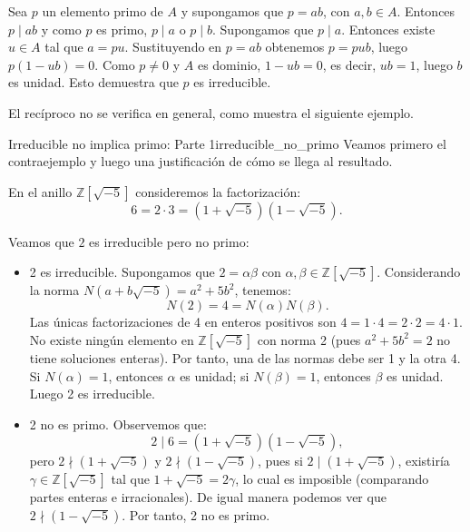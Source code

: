 \begin{proofbox}
Sea \(p\) un elemento primo de \(A\) y supongamos que \(p = ab\), con \(a, b \in A\). Entonces \(p \mid ab\) y como \(p\) es primo, \(p \mid a\) o \(p \mid b\). Supongamos que \(p \mid a\). Entonces existe \(u \in A\) tal que \(a = pu\). Sustituyendo en \(p = ab\) obtenemos \(p = pub\), luego \(p(1 - ub) = 0\). Como \(p \neq 0\) y \(A\) es dominio, \(1 - ub = 0\), es decir, \(ub = 1\), luego \(b\) es unidad. Esto demuestra que \(p\) es irreducible.
\end{proofbox}

El recíproco no se verifica en general, como muestra el siguiente ejemplo.

\begin{example}{Irreducible no implica primo: Parte 1}{irreducible_no_primo}
Veamos primero el contraejemplo y luego una justificación de cómo se llega al resultado.

En el anillo \(\mathbb{Z}[\sqrt{-5}]\) consideremos la factorización:
\[
6 = 2 \cdot 3 = (1 + \sqrt{-5})(1 - \sqrt{-5}).
\]

Veamos que \(2\) es irreducible pero no primo:
\begin{itemize}
\item 2 es irreducible. Supongamos que \(2 = \alpha\beta\) con \(\alpha, \beta \in \mathbb{Z}[\sqrt{-5}]\). Considerando la norma \(N(a + b\sqrt{-5}) = a^2 + 5b^2\), tenemos:
\[
N(2) = 4 = N(\alpha)N(\beta).
\]
Las únicas factorizaciones de 4 en enteros positivos son \(4 = 1 \cdot 4 = 2 \cdot 2 = 4 \cdot 1\). No existe ningún elemento en \(\mathbb{Z}[\sqrt{-5}]\) con norma 2 (pues \(a^2 + 5b^2 = 2\) no tiene soluciones enteras). Por tanto, una de las normas debe ser 1 y la otra 4. Si \(N(\alpha) = 1\), entonces \(\alpha\) es unidad; si \(N(\beta) = 1\), entonces \(\beta\) es unidad. Luego 2 es irreducible.

\item 2 no es primo. Observemos que:
\[
2 \mid 6 = (1 + \sqrt{-5})(1 - \sqrt{-5}),
\]
pero \(2 \nmid (1 + \sqrt{-5})\) y \(2 \nmid (1 - \sqrt{-5})\), pues si \(2 \mid (1 + \sqrt{-5})\), existiría \(\gamma \in \mathbb{Z}[\sqrt{-5}]\) tal que \(1 + \sqrt{-5} = 2\gamma\), lo cual es imposible (comparando partes enteras e irracionales). De igual manera podemos ver que \(2 \nmid (1 - \sqrt{-5})\). Por tanto, 2 no es primo.
\end{itemize}

\end{example}


